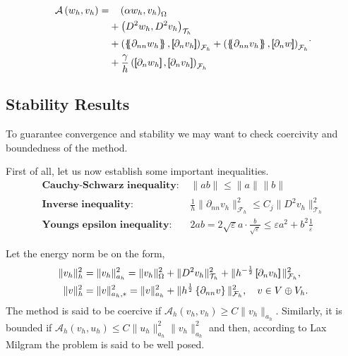 \begin{equation}
\label{eq:CP_A_h}
\begin{split}
\mathcal{A} \left( w_{h}, v_{h} \right)   =&
  \quad  \left( \alpha  w_{h}, v_{h} \right) _{\Omega }\\
&  +  \left( D^2 w_{h}, D^2v_{h} \right) _{\mathcal{T} _{h}} \\
 & +
  \left( \mean{  \partial _{n n} w_{h} }, \jump{ \partial _{n }v_{h}} \right)_{\mathcal{F}_{h}}  +
 \left( \mean{ \partial _{n n} v_{h} }, \jump{ \partial _{n}w }      \right)_{\mathcal{F}_{h}}
 \\
 & + \frac{\gamma }{h}  \left( \jump{ \partial _{n} w_{h}}, \jump{ \partial _{n} v_{h}   }   \right)_{\mathcal{F}_{h}} \\
\end{split}
.
\end{equation}

\subsection{ Stability Results}%
\label{sub:error_and_stability_analysis_of_c0ip}

To guarantee convergence and stability we may want to check coercivity and boundedness of the method.

First of all, let us now establish some important inequalities.
\[
\begin{split}
    \textbf{Cauchy-Schwarz inequality: } & \| ab \|_{  }^{  }  \le \| a \|_{  }^{  } \| b \|_{  }^{  }   \\
    \textbf{Inverse inequality: } & \frac{1}{h}\| \partial _{nn}  v_{h} \|_{\mathcal{F}_{h}   }^{2  }  \le C_{j} \| D ^2 v_{h} \|_{ \mathcal{T} _{h} }^{ 2 }   \\
    \textbf{Youngs epsilon inequality: } & 2ab =   2\sqrt{\varepsilon }a\cdot    \frac{b}{\sqrt{\varepsilon } } \le \varepsilon a^2+ b^2 \frac{1}{\varepsilon }
\end{split}
\]

Let the energy norm be on the form,
\begin{equation}
\label{eq:A_energy_norm}
    \begin{split}
\| v_{h} \|_{ h }^{2  } & = \| v_{h} \|_{ a_{h} }^{ 2 } =  \| v_{h} \|_{ \Omega  }^{2  }  +  \| D ^2 v_{h} \|_{ \mathcal{T} _{h}  }^{ 2 }  + \|  h^{-\frac{1}{2}} \left[\!\!\left[  \partial _{n} v_{h}     \right]\!\!\right]\|_{  \mathcal{F} _{h} }^{2  }, \\
\| v \|_{ h }^{ 2 }  &= \| v \|_{ a_{h},* }^{ 2 } = \| v \|_{ a_{h} }^{ 2 }  + \| h^{\frac{1}{2}} \left\{ \partial _{nn } v\right\}  \|_{ \mathcal{F}_{h}   }^{  2}, \quad  v\in V \oplus V_{h}.
    \end{split}
\end{equation}
The method is said to be coercive if $\mathcal{A} _{h}\left( v_{h}, v_{h} \right) \ge  C \| v_{h} \|_{ a_{h} }^{  } $. Similarly, it is bounded if $ \mathcal{A} _{h} \left( v_{h}, u_{h} \right) \le  C \| u_{h} \|_{  a_{h}}^{ 2 }  \| v_{h} \|_{ a_{h}
}^{ 2 } $ and then, according to Lax Milgram the problem is said to be well posed.

